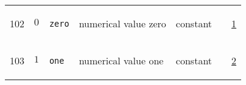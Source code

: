 \begin{longtable}{|p{1cm}|p{2.5cm}|p{4.5cm}|p{8cm}|p{3.0cm}|p{3cm}|p{1cm}|}
            102
             & \hypertarget{"v:102"}{ $ {0}{_{}} $}
             & \verb|zero|
             & numerical value zero
             & \begin{lay}constant \end{lay}
             & $  $
             &                 \hyperlink{"e:1"}{ 1 }
                 \\
            103
             & \hypertarget{"v:103"}{ $ {1}{_{}} $}
             & \verb|one|
             & numerical value one
             & \begin{lay}constant \end{lay}
             & $  $
             &                 \hyperlink{"e:2"}{ 2 }
                 \\
    \end{longtable}